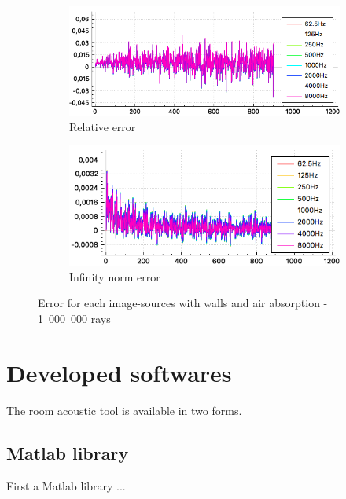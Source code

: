 \documentclass[AMA,STIX1COL]{WileyNJD-v2}
\begin{document}
\begin{figure}
\centering
	\begin{subfigure}{0.49\textwidth}
		\includegraphics[width=\linewidth]{test3_8}
		\caption{Relative error}
		\label{test3_8}
	\end{subfigure}
	\begin{subfigure}{0.49\textwidth}
		\includegraphics[width=\linewidth]{test3_9}
		\caption{Infinity norm error}
		\label{test3_9}
	\end{subfigure}
	\caption{Error for each image-sources with walls and air absorption - 1~000~000 rays}
\end{figure}


\section{Developed softwares }\label{sec6}

The room acoustic tool is available in two forms. 

\subsection{Matlab library}
First a Matlab library ... \\
\end{document}
